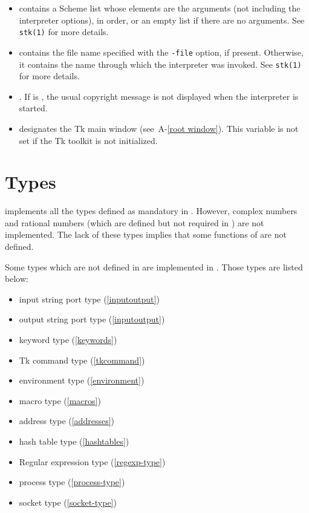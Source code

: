 \begin{itemize}
\item {\tt{}} contains a Scheme 
      list whose elements are the arguments (not including the interpreter
      options), in order, or an empty list if there are no arguments.
      See {\tt stk(1)} for more details.

\item {\tt{}} contains
      the file name specified with the {\tt -file} option, if present.
      Otherwise, it contains the name through which the interpreter was invoked.
      See {\tt stk(1)} for more details.

\item {\tt{}}. If 
      {\tt{}} is {\schfalse}, the usual copyright
      message is not displayed when the interpreter is started.

\item {\tt{}} designates the Tk main
      window (see~A-\ref{root window}). This variable is not set if
      the Tk toolkit is not initialized.
\end{itemize}

\section{Types}

{\stk} implements all the types defined as mandatory in {\rrrr}. However, complex
numbers and rational numbers (which are defined but not required in \rrrr) are
not implemented. The lack of these types implies that some functions of
{\rrrr} are not defined.

Some types which are not defined in {\rrrr} are implemented in {\stk}. Those 
types are listed below:
\begin{itemize}
\item input string port type (\ref{inputoutput})
\item output string port type (\ref{inputoutput})
\item keyword type (\ref{keywords})
\item Tk command type (\ref{tkcommand})
\item environment type (\ref{environment})
\item macro type (\ref{macros})
\item address type (\ref{addresses})
\item hash table type (\ref{hashtables})
\item Regular expression type (\ref{regexp-type})
\item process type (\ref{process-type})
\item socket type (\ref{socket-type})
\end{itemize}

